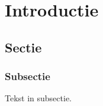 \documentclass[a4paper]{report}
\begin{document}


\chapter{Introductie}
\section{Sectie}
\subsection{Subsectie}
Tekst in subsectie.


\newpage


\end{document}
